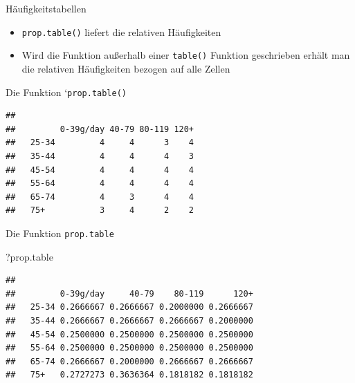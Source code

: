 \documentclass[
  ignorenonframetext,
]{beamer}
\newenvironment{Shaded}{\begin{snugshade}}{\end{snugshade}}
\newcommand{\DecValTok}[1]{\textcolor[rgb]{0.27,0.67,0.26}{#1}}
\newcommand{\KeywordTok}[1]{\textcolor[rgb]{0.26,0.66,0.93}{\textbf{#1}}}
\newcommand{\NormalTok}[1]{\textcolor[rgb]{0.74,0.68,0.62}{#1}}
\newcommand{\OperatorTok}[1]{\textcolor[rgb]{0.74,0.68,0.62}{#1}}
\providecommand{\tightlist}{%
  \setlength{\itemsep}{0pt}\setlength{\parskip}{0pt}}
\begin{document}
\begin{frame}[fragile]{Häufigkeitstabellen}
\protect\hypertarget{haufigkeitstabellen}{}

\begin{itemize}
\tightlist
\item
  \texttt{prop.table()} liefert die relativen Häufigkeiten
\item
  Wird die Funktion außerhalb einer \texttt{table()} Funktion
  geschrieben erhält man die relativen Häufigkeiten bezogen auf alle
  Zellen
\end{itemize}

Die Funktion `\texttt{prop.table()}

\begin{Shaded}
\end{Shaded}

\begin{verbatim}
##        
##         0-39g/day 40-79 80-119 120+
##   25-34         4     4      3    4
##   35-44         4     4      4    3
##   45-54         4     4      4    4
##   55-64         4     4      4    4
##   65-74         4     3      4    4
##   75+           3     4      2    2
\end{verbatim}

\end{frame}

\begin{frame}[fragile]{Die Funktion \texttt{prop.table}}
\protect\hypertarget{die-funktion-prop.table}{}

\begin{Shaded}
\begin{Highlighting}[]
\NormalTok{?prop.table}
\end{Highlighting}
\end{Shaded}

\begin{Shaded}
\end{Shaded}

\begin{verbatim}
##        
##         0-39g/day     40-79    80-119      120+
##   25-34 0.2666667 0.2666667 0.2000000 0.2666667
##   35-44 0.2666667 0.2666667 0.2666667 0.2000000
##   45-54 0.2500000 0.2500000 0.2500000 0.2500000
##   55-64 0.2500000 0.2500000 0.2500000 0.2500000
##   65-74 0.2666667 0.2000000 0.2666667 0.2666667
##   75+   0.2727273 0.3636364 0.1818182 0.1818182
\end{verbatim}

\end{frame}
\end{document}
